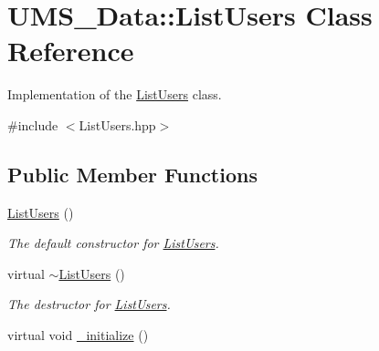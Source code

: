 \hypertarget{classUMS__Data_1_1ListUsers}{
\section{UMS\_\-Data::ListUsers Class Reference}
\label{classUMS__Data_1_1ListUsers}
}


Implementation of the \hyperlink{classUMS__Data_1_1ListUsers}{ListUsers} class.  




{\ttfamily \#include $<$ListUsers.hpp$>$}

\subsection*{Public Member Functions}
\begin{DoxyCompactItemize}
\item 
\hypertarget{classUMS__Data_1_1ListUsers_a0df0c0df3fb4a1f79ecfff48f3ae228b}{
\hyperlink{classUMS__Data_1_1ListUsers_a0df0c0df3fb4a1f79ecfff48f3ae228b}{ListUsers} ()}
\label{classUMS__Data_1_1ListUsers_a0df0c0df3fb4a1f79ecfff48f3ae228b}

\begin{DoxyCompactList}\small\item\em The default constructor for \hyperlink{classUMS__Data_1_1ListUsers}{ListUsers}. \item\end{DoxyCompactList}\item 
\hypertarget{classUMS__Data_1_1ListUsers_aa4cf771b774e9951c41cfc39039e4107}{
virtual \hyperlink{classUMS__Data_1_1ListUsers_aa4cf771b774e9951c41cfc39039e4107}{$\sim$ListUsers} ()}
\label{classUMS__Data_1_1ListUsers_aa4cf771b774e9951c41cfc39039e4107}

\begin{DoxyCompactList}\small\item\em The destructor for \hyperlink{classUMS__Data_1_1ListUsers}{ListUsers}. \item\end{DoxyCompactList}\item 
\hypertarget{classUMS__Data_1_1ListUsers_a29079417f17776349e7c4bbecb5ba0df}{
virtual void \hyperlink{classUMS__Data_1_1ListUsers_a29079417f17776349e7c4bbecb5ba0df}{\_\-initialize} ()}
\label{classUMS__Data_1_1ListUsers_a29079417f17776349e7c4bbecb5ba0df}


\end{DoxyCompactItemize}
